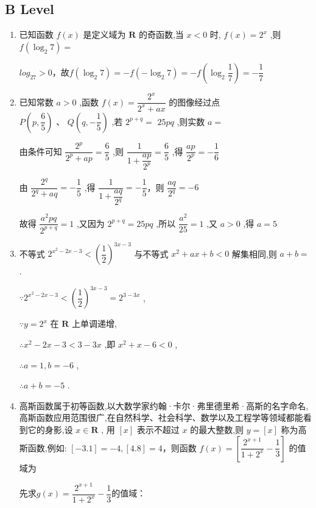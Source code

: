 \subsection*{B Level}
\begin{enumerate}
    \item 已知函数 $f\left( x\right)$ 是定义域为 $\mathbf{R}$ 的奇函数,当 $x < 0$ 时, $f\left( x\right)  = {2}^{x}$ ,则 $f\left( {{\log }_{2}7}\right)  =$ 
    \begin{jieda}
        $log_27 > 0$，故$f\left( {{\log }_{2}7}\right)  = - f(-{{\log }_{2}7}) = - f\left({{\log }_{2}\dfrac{1}{7}}\right) = -\dfrac{1}{7}$
    \end{jieda}
    \item 已知常数 $a > 0$ ,函数 $f\left( x\right)  = \dfrac{{2}^{x}}{{2}^{x} + {ax}}$ 的图像经过点 $P\left( {p,\dfrac{6}{5}}\right) \text{ 、 }Q\left( {q, - \dfrac{1}{5}}\right)$ ,若 ${2}^{p + q} =$  ${25pq}$ ,则实数 $a =$ 
    \begin{jieda}
        由条件可知 $\dfrac{{2}^{p}}{{2}^{p} + {ap}} = \dfrac{6}{5}$ ,则 $\dfrac{1}{1 + \dfrac{ap}{{2}^{p}}} = \dfrac{6}{5}$ ,得 $\dfrac{ap}{{2}^{p}} =  - \dfrac{1}{6}$
        
        由 $\dfrac{{2}^{q}}{{2}^{q} + {aq}} =  - \dfrac{1}{5}$ ,得 $\dfrac{1}{1 + \dfrac{aq}{{2}^{q}}} = - \dfrac{1}{5}$，则 $\dfrac{aq}{{2}^{q}} =  - 6$
        
        故得 $\dfrac{{a}^{2}{pq}}{{2}^{p + q}} = 1$ ,又因为 ${2}^{p + q} = {25pq}$ ,所以 $\dfrac{{a}^{2}}{25} = 1$ ,又 $a > 0$ ,得 $a = 5$
    \end{jieda}  
    \item 不等式 ${2}^{{x}^{2} - {2x} - 3} < {\left( \dfrac{1}{2}\right) }^{{3x} - 3}$ 与不等式 ${x}^{2} + {ax} + b < 0$ 解集相同,则 $a + b =$ .
    \begin{jieda}
        $\because {2}^{{x}^{2} - {2x} - 3} < {\left( \dfrac{1}{2}\right) }^{{3x} - 3} = {2}^{3 - {3x}}$ ,
        
        $\because y = {2}^{x}$ 在 $\mathbf{R}$ 上单调递增,
        
        $\therefore {x}^{2} - {2x} - 3 < 3 - {3x}$ ,即 ${x}^{2} + x - 6 < 0$ ,
        
        $\therefore a = 1,b =  - 6$ ,
        
        $\therefore a + b =  - 5$ .
    \end{jieda}
    \item 高斯函数属于初等函数,以大数学家约翰·卡尔·弗里德里希·高斯的名字命名,高斯函数应用范围很广,在自然科学、社会科学、数学以及工程学等领域都能看到它的身影,设 $x \in  \mathbf{R}$ , 用 $\left\lbrack  x\right\rbrack$ 表示不超过 $x$ 的最大整数,则 $y = \left\lbrack  x\right\rbrack$ 称为高斯函数,例如: $\left\lbrack  {-{3.1}}\right\rbrack   =  - 4,\left\lbrack  {4.8}\right\rbrack   = 4$，则函数 $f\left( x\right)  = \left\lbrack  {\dfrac{{2}^{x + 1}}{1 + {2}^{x}} - \dfrac{1}{3}}\right\rbrack$ 的值域为
    \begin{jieda}
        先求$g(x) = \dfrac{{2}^{x + 1}}{1 + {2}^{x}} - \dfrac{1}{3}$的值域：


\end{jieda}
\end{enumerate}
